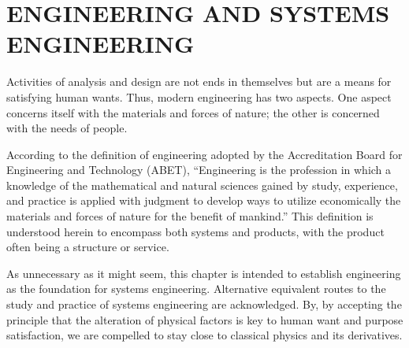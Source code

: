 \chapter{ENGINEERING AND SYSTEMS ENGINEERING}\label{chap:05}

Activities of analysis and design are not ends in themselves but are a means for satisfying human wants. Thus, modern engineering has two aspects. One aspect concerns itself with the materials and forces of nature; the other is concerned with the needs of people.

According to the definition of engineering adopted by the Accreditation Board for Engineering and Technology (ABET), ``Engineering is the profession in which a knowledge of the mathematical and natural sciences gained by study, experience, and practice is applied with judgment to develop ways to utilize economically the materials and forces of nature for the benefit of mankind.'' This definition is understood herein to encompass both systems and products, with the product often being a structure or service.

As unnecessary as it might seem, this chapter is intended to establish engineering as the foundation for systems engineering. Alternative equivalent routes to the study and practice of systems engineering are acknowledged. By, by accepting the principle that the alteration of physical factors is key to human want and purpose satisfaction, we are compelled to stay close to classical physics and its derivatives.









